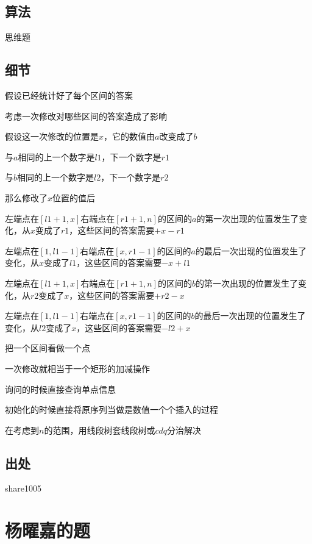 \documentclass[a4paper]{article}
\begin{document}
	\subsection{算法}
		
		思维题
		
	\subsection{细节}
		
		假设已经统计好了每个区间的答案
		
		考虑一次修改对哪些区间的答案造成了影响
		
		假设这一次修改的位置是$x$，它的数值由$a$改变成了$b$
		
		与$a$相同的上一个数字是$l1$，下一个数字是$r1$
		
		与$b$相同的上一个数字是$l2$，下一个数字是$r2$
		
		那么修改了$x$位置的值后
		
		左端点在$[l1+1,x]$右端点在$[r1+1,n]$的区间的$a$的第一次出现的位置发生了变化，从$x$变成了$r1$，这些区间的答案需要$+x-r1$
		
		左端点在$[1,l1-1]$右端点在$[x,r1-1]$的区间的$a$的最后一次出现的位置发生了变化，从$x$变成了$l1$，这些区间的答案需要$-x+l1$
		
		左端点在$[l1+1,x]$右端点在$[r1+1,n]$的区间的$b$的第一次出现的位置发生了变化，从$r2$变成了$x$，这些区间的答案需要$+r2-x$
		
		左端点在$[1,l1-1]$右端点在$[x,r1-1]$的区间的$b$的最后一次出现的位置发生了变化，从$l2$变成了$x$，这些区间的答案需要$-l2+x$
		
		把一个区间看做一个点
		
		一次修改就相当于一个矩形的加减操作
		
		询问的时候直接查询单点信息
		
		初始化的时候直接将原序列当做是数值一个个插入的过程
		
		在考虑到$n$的范围，用线段树套线段树或$cdq$分治解决
		
	\subsection{出处}
		
		share1005
	
	\newpage
	
	\section{杨曜嘉的题}
		
\end{document}
